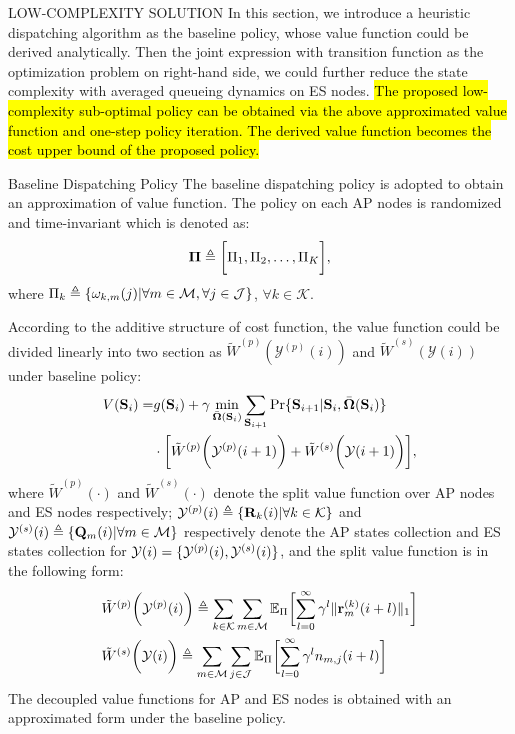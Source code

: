 \documentclass[10pt, conference, letterpaper]{IEEEtran}
\newcommand{\mat}{\mathbf}
\newcommand{\define}{\triangleq}
\renewcommand{\vec}{\mathbf}
\DeclarePairedDelimiter{\set}{\{}{\}}
\DeclarePairedDelimiter{\Inorm}{\|}{\|_1}
\DeclarePairedDelimiter{\Paren}{\bigg(}{\bigg)}
\DeclarePairedDelimiter{\Bracket}{\bigg[}{\bigg]}
\newcommand{\apSet}{\mathcal{K}}
\newcommand{\esSet}{\mathcal{M}}
\newcommand{\jSpace}{\mathcal{J}}
\newcommand{\Stat}{\mathbf{S}}
\newcommand{\Obsv}{\mathcal{Y}}
\newcommand{\Policy}{\boldsymbol{\Omega}}
\newcommand{\BPolicy}{\bar{\Policy}}
\begin{document}
    \begin{section}{LOW-COMPLEXITY SOLUTION}
        \label{sec:algorithm}
        In this section, we introduce a heuristic dispatching algorithm as the baseline policy, whose value function could be derived analytically. Then the joint expression with transition function as the optimization problem on right-hand side, we could further reduce the state complexity with averaged queueing dynamics on ES nodes.
        \hl{The proposed low-complexity sub-optimal policy can be obtained via the above approximated value function and one-step policy iteration. The derived value function becomes the cost upper bound of the proposed policy.}

        \begin{subsection}{Baseline Dispatching Policy}
            The baseline dispatching policy is adopted to obtain an approximation of value function. The policy on each AP nodes is randomized and time-invariant which is denoted as:
            \begin{align}
                \vec{\Pi} \define \Bracket{\Pi_1, \Pi_2, \dots, \Pi_K},
            \end{align}
            where $\Pi_k \define \set{\omega_{k,m}(j)|\forall m\in\esSet,\forall j\in\jSpace}$, $\forall k\in\apSet$.

            According to the additive structure of cost function, the value function could be divided linearly into two section as $\tilde{W}^{(p)}(\Obsv^{(p)}(i))$ and $\tilde{W}^{(s)}(\Obsv(i))$ under baseline policy:
            \begin{align}
                V(\Stat_{i}) =& 
                    g(\Stat_{i}) + \gamma \min_{\BPolicy(\Stat_{i})} \sum_{\Stat_{i+1}} \Pr\{ \Stat_{i+1}|\Stat_{i}, \BPolicy(\Stat_{i}) \}
                    \nonumber\\
                    & \cdot \Bracket{ \tilde{W}^{(p)}\Paren{\Obsv^{(p)}(i+1)} + \tilde{W}^{(s)}\Paren{\Obsv(i+1)} },
            \end{align}
            where $\tilde{W}^{(p)}(\cdot)$ and $\tilde{W}^{(s)}(\cdot)$ denote the split value function over AP nodes and ES nodes respectively; $\Obsv^{(p)}(i) \define \set{\mat{R}_k(i)|\forall k\in\apSet}$ and $\Obsv^{(s)}(i) \define \set{\vec{Q}_m(i)|\forall m\in\esSet}$ respectively denote the AP states collection and ES states collection for $\Obsv(i) = \set{\Obsv^{(p)}(i), \Obsv^{(s)}(i)}$, and the split value function is in the following form:
            \begin{align}
                &\tilde{W}^{(p)}\Paren{\Obsv^{(p)}(i)} \define \sum_{k\in\apSet}\sum_{m\in\esSet}
                    \mathbb{E}_{\Pi}\Bracket{\sum_{l=0}^{\infty} \gamma^{l} \Inorm{\vec{r}^{(k)}_{m}(i+l)}}
                \\
                &\tilde{W}^{(s)}\Paren{\Obsv(i)} \define \sum_{m\in\esSet} \sum_{j\in\jSpace}
                    \mathbb{E}_{\Pi}\Bracket{\sum_{l=0}^{\infty} \gamma^{l} n_{m,j}(i+l)}
            \end{align}
            The decoupled value functions for AP and ES nodes is obtained with an approximated form under the baseline policy.


\end{subsection}
\end{section}
\end{document}
